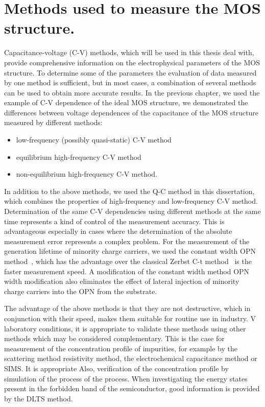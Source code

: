 
\chapter{Methods used to measure the MOS structure.}%
\label{Chapter3}%


Capacitance-voltage (C-V) methods, which will be used in this thesis
deal with, provide comprehensive information on the electrophysical
parameters of the MOS structure.  To determine some of the parameters
the evaluation of data measured by one method is sufficient, but in
most cases, a combination of several methods can be used to obtain
more accurate results.  In the previous chapter, we used the example
of C-V dependence of the ideal MOS structure, we demonstrated the
differences between voltage dependences of the capacitance of the MOS
structure measured by different methods:

\begin{itemize}
\item low-frequency (possibly quasi-static) C-V method
\item equilibrium high-frequency C-V method
\item non-equilibrium high-frequency C-V method.
\end{itemize}

In addition to the above methods, we used the Q-C method in this
dissertation, which combines the properties of high-frequency and
low-frequency C-V method. Determination of the same C-V dependencies
using different methods at the same time represents a kind of control
of the measurement accuracy.  This is advantageous especially in cases
where the determination of the absolute measurement error represents a
complex problem. For the measurement of the generation lifetime of
minority charge carriers, we used the constant width OPN
method~\cite{3.1}, which has the advantage over the classical Zerbst
C-t method~\cite{3.2} is the faster measurement speed. A modification
of the constant width method OPN~\cite{3.3} width modification also
eliminates the effect of lateral injection of minority charge carriers
into the OPN from the substrate.

The advantage of the above methods is that they are not destructive,
which in conjunction with their speed, makes them suitable for routine
use in industry.  V laboratory conditions, it is appropriate to
validate these methods using other methods which may be considered
complementary. This is the case for measurement of the concentration
profile of impurities, for example by the scattering method
resistivity method, the electrochemical capacitance method or
SIMS\@. It is appropriate Also, verification of the concentration
profile by simulation of the process of the process. When
investigating the energy states present in the forbidden band of the
semiconductor, good information is provided by the DLTS method.

